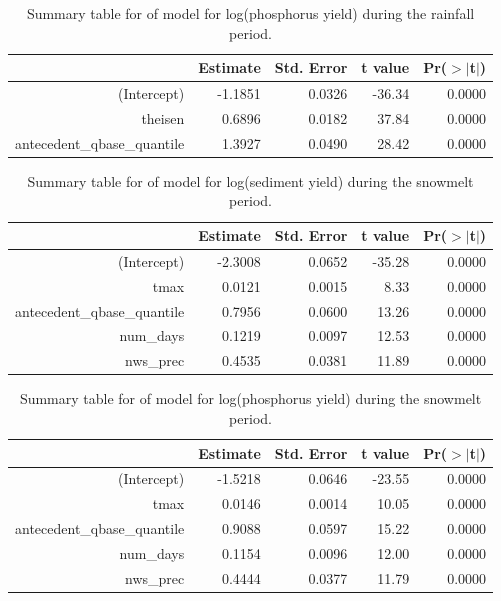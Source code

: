 \documentclass[10pt]{article}
\begin{document}
\begin{table}[ht]
\begin{center}
\begin{tabular}{rrrrr}
  \hline
 & Estimate & Std. Error & t value & Pr($>$$|$t$|$) \\ 
  \hline
(Intercept) & -1.1851 & 0.0326 & -36.34 & 0.0000 \\ 
  theisen & 0.6896 & 0.0182 & 37.84 & 0.0000 \\ 
  antecedent\_qbase\_quantile & 1.3927 & 0.0490 & 28.42 & 0.0000 \\ 
   \hline
\end{tabular}
\caption{Summary table for of model for log(phosphorus yield) during the rainfall period.}
\end{center}
\end{table}

\begin{table}[ht]
\begin{center}
\begin{tabular}{rrrrr}
  \hline
 & Estimate & Std. Error & t value & Pr($>$$|$t$|$) \\ 
  \hline
(Intercept) & -2.3008 & 0.0652 & -35.28 & 0.0000 \\ 
  tmax & 0.0121 & 0.0015 & 8.33 & 0.0000 \\ 
  antecedent\_qbase\_quantile & 0.7956 & 0.0600 & 13.26 & 0.0000 \\ 
  num\_days & 0.1219 & 0.0097 & 12.53 & 0.0000 \\ 
  nws\_prec & 0.4535 & 0.0381 & 11.89 & 0.0000 \\ 
   \hline
\end{tabular}
\caption{Summary table for of model for log(sediment yield) during the snowmelt period.}
\end{center}
\end{table}

\begin{table}[ht]
\begin{center}
\begin{tabular}{rrrrr}
  \hline
 & Estimate & Std. Error & t value & Pr($>$$|$t$|$) \\ 
  \hline
(Intercept) & -1.5218 & 0.0646 & -23.55 & 0.0000 \\ 
  tmax & 0.0146 & 0.0014 & 10.05 & 0.0000 \\ 
  antecedent\_qbase\_quantile & 0.9088 & 0.0597 & 15.22 & 0.0000 \\ 
  num\_days & 0.1154 & 0.0096 & 12.00 & 0.0000 \\ 
  nws\_prec & 0.4444 & 0.0377 & 11.79 & 0.0000 \\ 
   \hline
\end{tabular}
\caption{Summary table for of model for log(phosphorus yield) during the snowmelt period.}
\end{center}
\end{table}
\end{document}
